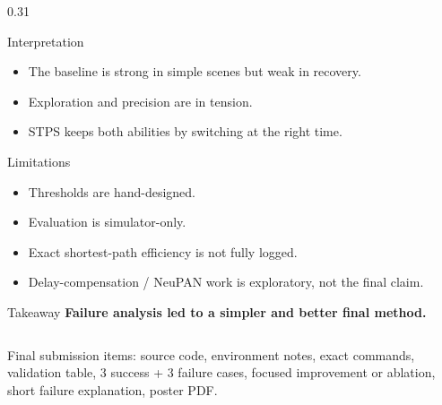 \documentclass[final]{beamer}
\begin{document}
\begin{frame}[t]
\begin{columns}[t,totalwidth=\textwidth]
\begin{column}{0.31\textwidth}
  \begin{block}{Interpretation}
    \begin{itemize}[leftmargin=1.2em]
      \item The baseline is strong in simple scenes but weak in recovery.
      \item Exploration and precision are in tension.
      \item STPS keeps both abilities by switching at the right time.
    \end{itemize}
  \end{block}

  \begin{block}{Limitations}
    \begin{itemize}[leftmargin=1.2em]
      \item Thresholds are hand-designed.
      \item Evaluation is simulator-only.
      \item Exact shortest-path efficiency is not fully logged.
      \item Delay-compensation / NeuPAN work is exploratory, not the final claim.
    \end{itemize}
  \end{block}

  \begin{block}{Takeaway}
    \centering
    \Large\bfseries
    Failure analysis led to a simpler and better final method.
  \end{block}
\end{column}

\end{columns}

\vspace{0.5em}
\begin{center}
  \small
  Final submission items: source code, environment notes, exact commands, validation table, 3 success + 3 failure cases, focused improvement or ablation, short failure explanation, poster PDF.
\end{center}

\end{frame}
\end{document}
